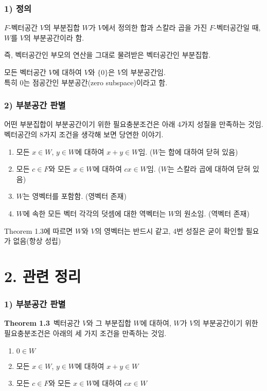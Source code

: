\documentclass[10pt, a4paper]{article}
\begin{document}
\subsubsection*{1) 정의}
$F$-벡터공간 $V$의 부분집합 $W$가 $V$에서 정의한 합과 스칼라 곱을 가진 $F$-벡터공간일 때, $W$를 $V$의 부분공간이라 함.

즉, 벡터공간인 부모의 연산을 그대로 물려받은 벡터공간인 부분집합.

모든 벡터공간 $V$에 대하여 $V$와 $\{ 0 \}$은 $V$의 부분공간임.\\
특히 ${0}$는 점공간인 부분공간(zero subspace)이라고 함.

\subsubsection*{2) 부분공간 판별}
어떤 부분집합이 부분공간이기 위한 필요충분조건은 아래 4가지 성질을 만족하는 것임.\\
벡터공간의 8가지 조건을 생각해 보면 당연한 이야기.

\begin{enumerate}
    \item 모든 $x \in W$, $y \in W$에 대하여 $x+y \in W$임. ($W$는 합에 대하여 닫혀 있음)
    \item 모든 $c \in F$와 모든 $x \in W$에 대하여 $cx \in W$임. ($W$는 스칼라 곱에 대하여 닫혀 있음)
    \item $W$는 영벡터를 포함함. (영벡터 존재)
    \item $W$에 속한 모든 벡터 각각의 덧셈에 대한 역벡터는 $W$의 원소임. (역벡터 존재)
\end{enumerate}

Theorem 1.3에 따르면 $W$와 $V$의 영벡터는 반드시 같고, 4번 성질은 굳이 확인할 필요가 없음(항상 성립)\\


\section*{2. 관련 정리}
\subsubsection*{1) 부분공간 판별}
\textbf{Theorem 1.3}\, 벡터공간 $V$와 그 부분집합 $W$에 대하여, $W$가 $V$의 부분공간이기 위한 필요충분조건은 아래의 세 가지 조건을 만족하는 것임.

\begin{enumerate}
    \item $0 \in W$
    \item 모든 $x \in W$, $y \in W$에 대하여 $x+y \in W$
    \item 모든 $c \in F$와 모든 $x \in W$에 대하여 $cx \in W$
\end{enumerate}
\end{document}
